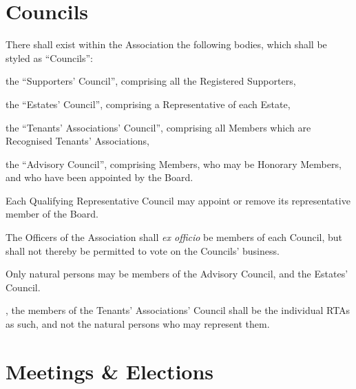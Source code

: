 \documentclass[10pt]{mk-articles-of-association}
\newcommand{\EC}[0]{Board}
\newcommand{\RTA}[0]{Recognised Tenants' Association}
\begin{document}

\section{Councils}
\label{councils}
\begin{constenum}

\item There shall exist within the Association the following bodies, which
  shall be styled as ``Councils'':
  \begin{constenum}
  \item the ``Supporters' Council'', comprising all the Registered
    Supporters,
  \item the ``Estates' Council'', comprising a Representative of each Estate,
  \item the ``Tenants' Associations' Council'', comprising all Members
    which are \RTA{}s, \ITand
  \item the ``Advisory Council'', comprising Members, who may be
    Honorary Members, and who have been appointed by the
    \EC{}.\label{advcouncil}
  \end{constenum}

\item Each Qualifying Representative Council may
  appoint or remove its representative member of the \EC{}.
  \label{councilreps}

\item The Officers of the Association shall \textit{ex officio} be members
  of each Council, but shall not thereby be permitted to vote on the
  Councils' business.

\item Only natural persons may be members of the Advisory Council, and
  the Estates' Council.

\item \avoiddoubt, the members of the Tenants' Associations' Council
  shall be the individual RTAs as such, and not the natural persons
  who may represent them.

\end{constenum}


\section{Meetings \& Elections}
\end{document}
